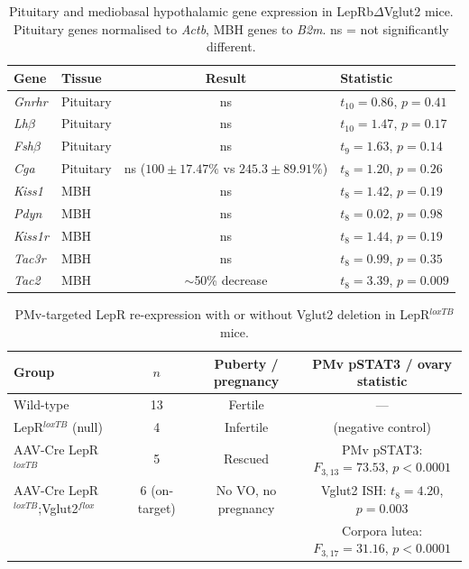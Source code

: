 \documentclass[11pt]{article}
\begin{document}
\begin{table}[htbp]
\centering
\caption{Pituitary and mediobasal hypothalamic gene expression in LepRb$\Delta$Vglut2 mice. Pituitary genes normalised to \textit{Actb}, MBH genes to \textit{B2m}. ns = not significantly different.}
\label{tab:qpcr}
\begin{tabular}{llcl}
\toprule
Gene & Tissue & Result & Statistic \\
\midrule
\textit{Gnrhr} & Pituitary & ns & $t_{10}=0.86$, $p=0.41$ \\
\textit{Lh$\beta$} & Pituitary & ns & $t_{10}=1.47$, $p=0.17$ \\
\textit{Fsh$\beta$} & Pituitary & ns & $t_{9}=1.63$, $p=0.14$ \\
\textit{Cga} & Pituitary & ns ($100\pm17.47\%$ vs $245.3\pm89.91\%$) & $t_{8}=1.20$, $p=0.26$ \\
\textit{Kiss1} & MBH & ns & $t_{8}=1.42$, $p=0.19$ \\
\textit{Pdyn} & MBH & ns & $t_{8}=0.02$, $p=0.98$ \\
\textit{Kiss1r} & MBH & ns & $t_{8}=1.44$, $p=0.19$ \\
\textit{Tac3r} & MBH & ns & $t_{8}=0.99$, $p=0.35$ \\
\textit{Tac2} & MBH & $\sim$50\% decrease & $t_{8}=3.39$, $p=0.009$ \\
\bottomrule
\end{tabular}
\end{table}

\begin{table}[htbp]
\centering
\caption{PMv-targeted LepR re-expression with or without Vglut2 deletion in LepR$^{loxTB}$ mice.}
\label{tab:rescue}
\begin{tabular}{lccc}
\toprule
Group & $n$ & Puberty / pregnancy & PMv pSTAT3 / ovary statistic \\
\midrule
Wild-type & 13 & Fertile & --- \\
LepR$^{loxTB}$ (null) & 4 & Infertile & (negative control) \\
AAV-Cre LepR$^{loxTB}$ & 5 & Rescued & PMv pSTAT3: $F_{3,13}=73.53$, $p<0.0001$ \\
AAV-Cre LepR$^{loxTB}$;Vglut2$^{flox}$ & 6 (on-target) & No VO, no pregnancy & Vglut2 ISH: $t_{8}=4.20$, $p=0.003$ \\
 & & & Corpora lutea: $F_{3,17}=31.16$, $p<0.0001$ \\
\bottomrule
\end{tabular}
\end{table}
\end{document}
